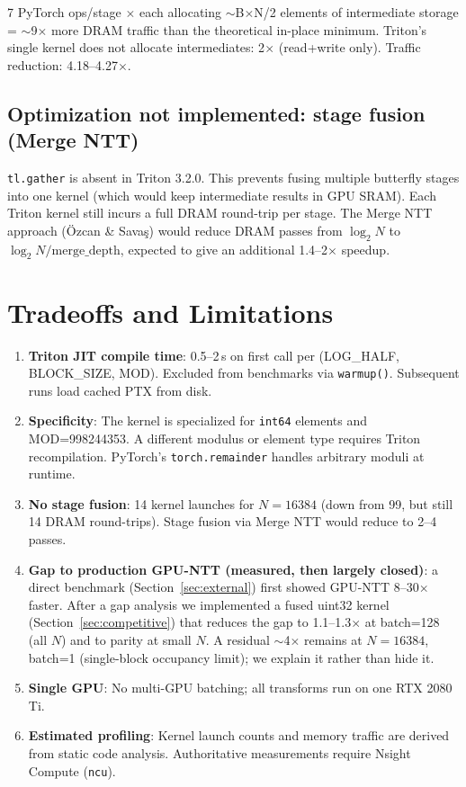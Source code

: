 \documentclass[11pt,a4paper]{article}
\begin{document}
7 PyTorch ops/stage $\times$ each allocating $\sim$B$\times$N/2 elements of intermediate
storage = $\sim$9$\times$ more DRAM traffic than the theoretical in-place minimum.
Triton's single kernel does not allocate intermediates: 2$\times$ (read+write only).
Traffic reduction: 4.18--4.27$\times$.

\subsection{Optimization not implemented: stage fusion (Merge NTT)}

\texttt{tl.gather} is absent in Triton 3.2.0. This prevents fusing multiple butterfly
stages into one kernel (which would keep intermediate results in GPU SRAM). Each Triton
kernel still incurs a full DRAM round-trip per stage. The Merge NTT approach
(Özcan \& Savaş) would reduce DRAM passes from $\log_2 N$ to $\log_2 N /
\text{merge\_depth}$, expected to give an additional 1.4--2$\times$ speedup.

\section{Tradeoffs and Limitations}

\begin{enumerate}
  \item \textbf{Triton JIT compile time}: 0.5--2\,s on first call per (LOG\_HALF,
    BLOCK\_SIZE, MOD). Excluded from benchmarks via \texttt{warmup()}. Subsequent runs
    load cached PTX from disk.

  \item \textbf{Specificity}: The kernel is specialized for \texttt{int64} elements and
    MOD=998244353. A different modulus or element type requires Triton recompilation.
    PyTorch's \texttt{torch.remainder} handles arbitrary moduli at runtime.

  \item \textbf{No stage fusion}: 14 kernel launches for $N=16384$ (down from 99, but
    still 14 DRAM round-trips). Stage fusion via Merge NTT would reduce to 2--4 passes.

  \item \textbf{Gap to production GPU-NTT (measured, then largely closed)}: a direct benchmark
    (Section~\ref{sec:external}) first showed GPU-NTT 8--30$\times$ faster. After a gap analysis we
    implemented a fused uint32 kernel (Section~\ref{sec:competitive}) that reduces the gap to
    1.1--1.3$\times$ at batch=128 (all $N$) and to parity at small $N$. A residual $\sim$4$\times$
    remains at $N=16384$, batch=1 (single-block occupancy limit); we explain it rather than hide it.

  \item \textbf{Single GPU}: No multi-GPU batching; all transforms run on one RTX 2080 Ti.

  \item \textbf{Estimated profiling}: Kernel launch counts and memory traffic are derived
    from static code analysis. Authoritative measurements require Nsight Compute (\texttt{ncu}).
\end{enumerate}
\end{document}
